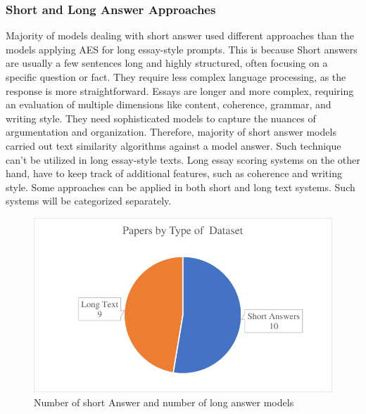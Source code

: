 \documentclass{article}
\begin{document}
	\subsubsection*{Short and Long Answer Approaches}
	Majority of models dealing with short answer used different approaches than the models applying AES for long essay-style prompts. This is because Short answers are usually a few sentences long and highly structured, often focusing on a specific question or fact. They require less complex language processing, as the response is more straightforward. Essays are longer and more complex, requiring an evaluation of multiple dimensions like content, coherence, grammar, and writing style. They need sophisticated models to capture the nuances of argumentation and organization. Therefore, majority of short answer models carried out text similarity algorithms against a model answer. Such technique can't be utilized in long essay-style texts. Long essay scoring systems on the other hand, have to keep track of additional features, such as coherence and writing style. Some approaches can be applied in both short and long text systems. Such systems will be categorized separately.
	\begin{figure}[H]
		\centering
		\includegraphics[width=0.5\linewidth]{img/papersbytype.pdf}
		\caption{Number of short Answer and number of long answer models}
		\label{shortlongcomparison}
	\end{figure}
	
\end{document}

